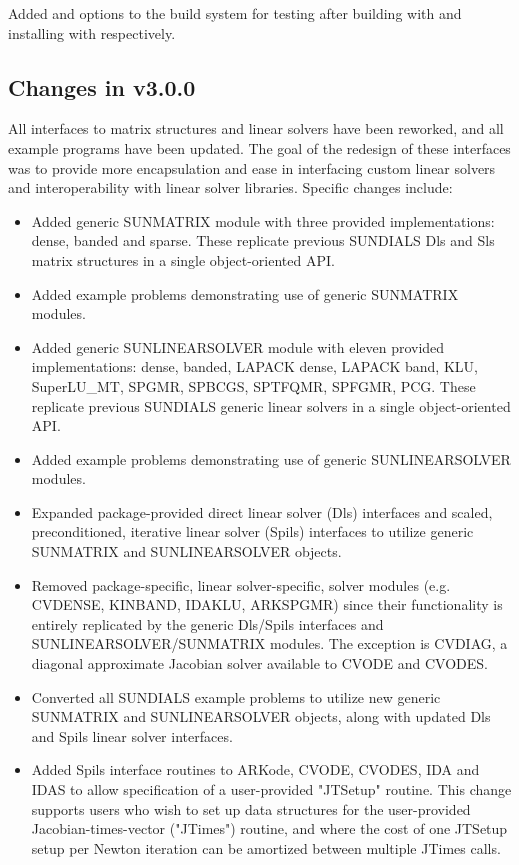 Added  and  options to the build
system for testing {\sundials} after building with  and
installing with  respectively.

\subsection*{Changes in v3.0.0}

All interfaces to matrix structures and linear solvers
have been reworked, and all example programs have been updated.
The goal of the redesign of these interfaces was to provide more encapsulation
and ease in interfacing custom linear solvers and interoperability
with linear solver libraries.
Specific changes include:
\begin{itemize}
\item Added generic SUNMATRIX module with three provided implementations:
        dense, banded and sparse.  These replicate previous SUNDIALS Dls and
        Sls matrix structures in a single object-oriented API.
\item Added example problems demonstrating use of generic SUNMATRIX modules.
\item Added generic SUNLINEARSOLVER module with eleven provided
        implementations: dense, banded, LAPACK dense, LAPACK band, KLU,
        SuperLU\_MT, SPGMR, SPBCGS, SPTFQMR, SPFGMR, PCG.  These replicate
        previous SUNDIALS generic linear solvers in a single object-oriented
        API.
\item Added example problems demonstrating use of generic SUNLINEARSOLVER
        modules.
\item Expanded package-provided direct linear solver (Dls) interfaces and
        scaled, preconditioned, iterative linear solver (Spils) interfaces
        to utilize generic SUNMATRIX and SUNLINEARSOLVER objects.
\item Removed package-specific, linear solver-specific, solver modules
        (e.g. CVDENSE, KINBAND, IDAKLU, ARKSPGMR) since their functionality
        is entirely replicated by the generic Dls/Spils interfaces and
        SUNLINEARSOLVER/SUNMATRIX modules.  The exception is CVDIAG, a
        diagonal approximate Jacobian solver available to CVODE and CVODES.
\item Converted all SUNDIALS example problems to utilize new generic
        SUNMATRIX and SUNLINEARSOLVER objects, along with updated Dls and
        Spils linear solver interfaces.
\item Added Spils interface routines to ARKode, CVODE, CVODES, IDA and
        IDAS to allow specification of a user-provided "JTSetup" routine.
        This change supports users who wish to set up data structures for
        the user-provided Jacobian-times-vector ("JTimes") routine, and
        where the cost of one JTSetup setup per Newton iteration can be
        amortized between multiple JTimes calls.
\end{itemize}

